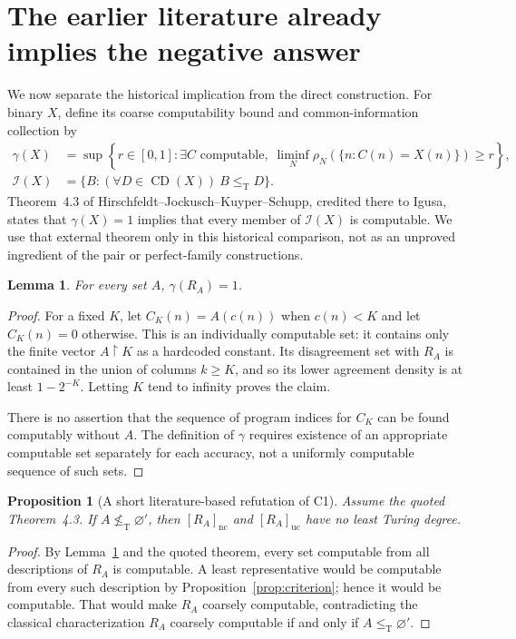 \documentclass[11pt,a4paper]{article}
\newcommand{\leT}{\leq_{\mathrm T}}
\newcommand{\nleT}{\nleq_{\mathrm T}}
\newcommand{\CD}{\operatorname{CD}}
\newcommand{\nc}{\mathrm{nc}}
\newcommand{\uc}{\mathrm{uc}}
\newcommand{\restr}{\mathbin{\upharpoonright}}
\newtheorem{lemma}[theorem]{Lemma}
\newtheorem{proposition}[theorem]{Proposition}
\theoremstyle{definition}\newtheorem{definition}[theorem]{Definition}
\theoremstyle{remark}\newtheorem{remark}[theorem]{Remark}
\begin{document}
\section{The earlier literature already implies the negative answer}
\label{sec:literature}
We now separate the historical implication from the direct construction. For binary $X$, define its coarse computability bound and common-information collection by
\begin{align*}
 \gamma(X)&=\sup\left\{r\in[0,1]:
  \exists C\text{ computable},\;
  \liminf_N\rho_N(\{n:C(n)=X(n)\})\geq r\right\},\\
 \mathcal I(X)&=\{B:(\forall D\in\CD(X))\ B\leT D\}.
\end{align*}
Theorem~4.3 of Hirschfeldt--Jockusch--Kuyper--Schupp, credited there to Igusa, states that $\gamma(X)=1$ implies that every member of $\mathcal I(X)$ is computable.\cite[Theorem~4.3]{HJKS} We use that external theorem only in this historical comparison, not as an unproved ingredient of the pair or perfect-family constructions.

\begin{lemma}\label{lem:gamma}
For every set $A$, $\gamma(R_A)=1$.
\end{lemma}
\begin{proof}
For a fixed $K$, let $C_K(n)=A(c(n))$ when $c(n)<K$ and let $C_K(n)=0$ otherwise. This is an individually computable set: it contains only the finite vector $A\restr K$ as a hardcoded constant. Its disagreement set with $R_A$ is contained in the union of columns $k\geq K$, and so its lower agreement density is at least $1-2^{-K}$. Letting $K$ tend to infinity proves the claim.

There is no assertion that the sequence of program indices for $C_K$ can be found computably without $A$. The definition of $\gamma$ requires existence of an appropriate computable set separately for each accuracy, not a uniformly computable sequence of such sets.
\end{proof}

\begin{proposition}[A short literature-based refutation of C1]\label{prop:oldroute}
Assume the quoted Theorem~4.3. If $A\nleT\varnothing'$, then $[R_A]_\nc$ and $[R_A]_\uc$ have no least Turing degree.
\end{proposition}
\begin{proof}
By Lemma~\ref{lem:gamma} and the quoted theorem, every set computable from all descriptions of $R_A$ is computable. A least representative would be computable from every such description by Proposition~\ref{prop:criterion}; hence it would be computable. That would make $R_A$ coarsely computable, contradicting the classical characterization $R_A$ coarsely computable if and only if $A\leT\varnothing'$.
\end{proof}
\end{document}
